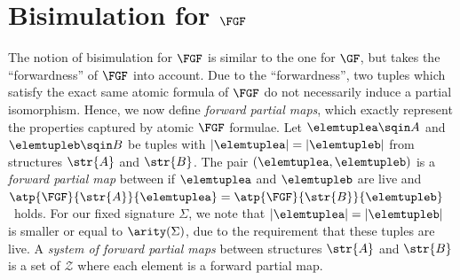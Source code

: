 \section{Bisimulation for $\FGF$}
The notion of bisimulation for $\FGF$ is similar to the one for $\GF$, but takes the ``forwardness'' of $\FGF$ into account.
Due to the ``forwardness'', two tuples which satisfy the exact same atomic formula of $\FGF$ do not necessarily induce a partial isomorphism.
Hence, we now define \emph{forward partial maps}, which exactly represent the properties captured by atomic $\FGF$ formulae.
Let $\elemtuplea \sqin A$ and $\elemtupleb \sqin B$ be tuples with $|\elemtuplea| = |\elemtupleb|$ from structures $\str{A}$ and $\str{B}$.
The pair $(\elemtuplea, \elemtupleb)$ is a \emph{forward partial map} between if $\elemtuplea$ and $\elemtupleb$ are live and $\atp{\FGF}{\str{A}}{\elemtuplea} = \atp{\FGF}{\str{B}}{\elemtupleb}$~holds.
For our fixed signature $\Sigma$, we note that $|\elemtuplea| = |\elemtupleb|$ is smaller or equal to $\arity(\Sigma)$, due to the requirement that these tuples are live.
A \emph{system of forward partial maps} between structures $\str{A}$ and $\str{B}$ is a set of $\mathcal{Z}$ where each element is a forward partial map.

